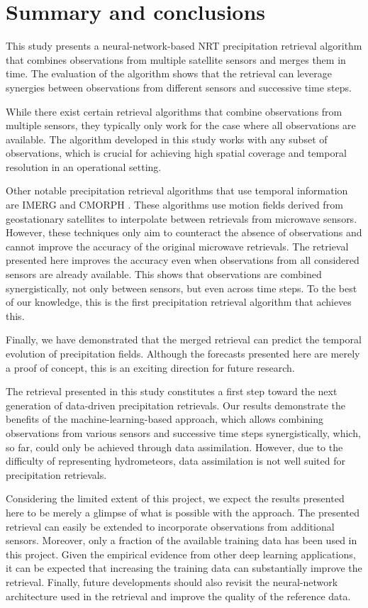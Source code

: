 \documentclass[11pt]{scrartcl}
\begin{document}
\section{Summary and conclusions}
\label{sec:conclusions}

This study presents a neural-network-based NRT precipitation retrieval algorithm that combines observations from multiple satellite sensors and merges them in time. The evaluation of the algorithm shows that the retrieval can leverage synergies between observations from different sensors and successive time steps.

While there exist certain retrieval algorithms \citep{gorooh22} that combine observations from multiple sensors, they typically only work for the case where all observations are available. The algorithm developed in this study works with any subset of observations, which is crucial for achieving high spatial coverage and temporal resolution in an operational setting.

Other notable precipitation retrieval algorithms that use temporal information
are IMERG \citep{huffman20} and CMORPH \citep{joyce11}. These algorithms use
motion fields derived from geostationary satellites to interpolate between
retrievals from microwave sensors. However, these techniques only aim to
counteract the absence of observations and  cannot improve the accuracy of
the original microwave retrievals. The retrieval presented here improves the
accuracy even when observations from all considered sensors are already
available. This shows that observations are combined synergistically, not only
between sensors, but even across time steps. To the best of our knowledge, this
is the first precipitation retrieval algorithm that achieves this.

Finally, we have demonstrated that the merged retrieval can predict the temporal
evolution of precipitation fields. Although the forecasts presented here are
merely a proof of concept, this is an exciting direction for future research.

The retrieval presented in this study constitutes a first step toward the next generation of data-driven precipitation retrievals. Our results demonstrate the benefits of the machine-learning-based approach, which allows combining observations from various sensors and successive time steps synergistically, which, so far, could only be achieved through data assimilation. However, due to the difficulty of representing hydrometeors, data assimilation is not well suited for precipitation retrievals.

Considering the limited extent of this project, we expect the results presented
here to be merely a glimpse of what is possible with the approach. The presented
retrieval can easily be extended to incorporate observations from additional
sensors. Moreover, only a fraction of the available training data has been used
in this project. Given the empirical evidence from other deep learning
applications, it can be expected that increasing the training data can
substantially improve the retrieval. Finally, future developments should also
revisit the neural-network architecture used in the retrieval and improve the
quality of the reference data.





\end{document}
